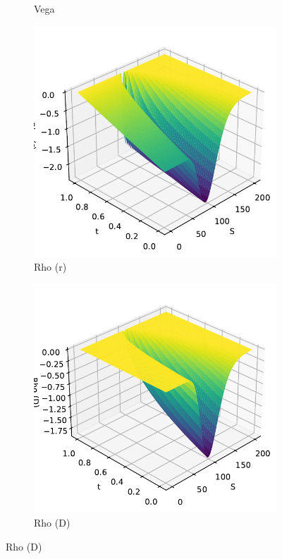 \begin{figure}[H]
\begin{subfigure}[b]{0.3\linewidth}
        \caption{Vega}
    \end{subfigure}
    \begin{subfigure}[b]{0.3\linewidth}
        \includegraphics[width=\linewidth]{Imagenes/Parte1/6_Sols/Binary_Put/Binary_Put_Rho_r.pdf}
        \caption{Rho (r)}
    \end{subfigure}
    \begin{subfigure}[b]{0.3\linewidth}
        \includegraphics[width=\linewidth]{Imagenes/Parte1/6_Sols/Binary_Put/Binary_Put_Rho_D.pdf}
        \caption{Rho (D)}
    \end{subfigure}
\end{figure}





